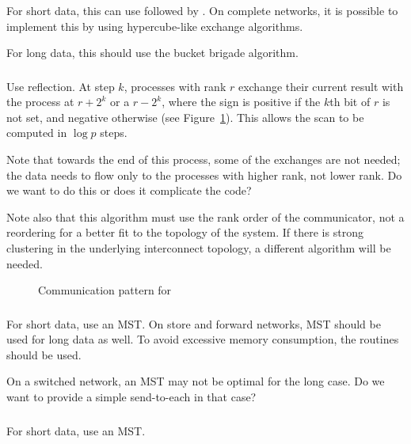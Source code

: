 \documentclass{article}
\begin{document}
\subsubsection{}
For short data, this can use  followed by
.  On 
complete networks, it is possible to implement this by using hypercube-like
exchange algorithms.

For long data, this should use the bucket brigade algorithm.

\subsubsection{}
Use reflection.  At step $k$, processes with rank $r$ exchange their current
result with the process at $r+2^k$ or a $r-2^k$, where the sign is positive if
the $k$th bit of $r$ is not set, and negative otherwise (see
Figure~\ref{fig:scan-pattern}).  This allows the scan 
to be computed in $\log p$ steps.  

Note that towards the end of this process, some of the exchanges are not
needed; the data needs to flow only to the processes with higher rank, not
lower rank.  Do we want to do this or does it complicate the code?

Note also that this algorithm must use the rank order of the communicator, not
a reordering for a better fit to the topology of the system.  If there is
strong clustering in the underlying interconnect topology, a different
algorithm will be needed.

\begin{figure}
\centerline{}
\caption{Communication pattern for }\label{fig:scan-pattern}
\end{figure}

\subsubsection{}
For short data, use an MST. On store and forward networks, MST should be used
for long data as well.  To avoid excessive memory consumption, the
 routines should be used.

On a switched network, an MST may not be optimal for the long case.  Do we
want to provide a simple send-to-each in that case?

\subsubsection{}
For short data, use an MST. 
\end{document}
